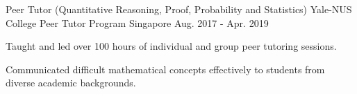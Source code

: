 

\begin{cventries}

  \cventry
  {Peer Tutor (Quantitative Reasoning, Proof, Probability and Statistics)} %
  {Yale-NUS College Peer Tutor Program} %
  {Singapore} %
  {Aug. 2017 - Apr. 2019} %
  {
    \begin{cvitems} %
    \item {Taught and led over 100 hours of individual and group peer tutoring
        sessions.}
    \item {Communicated difficult mathematical concepts effectively to students
        from diverse academic backgrounds.}
    \end{cvitems}
  }

\end{cventries}
